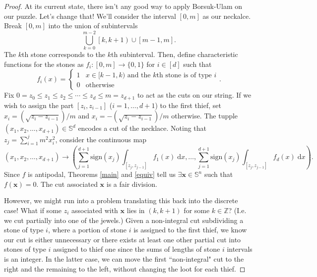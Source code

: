 \documentclass[12pt]{amsart}
\theoremstyle{definition}
\begin{document}
    \begin{proof}
        At its current state, there isn't any good way to apply Borsuk-Ulam on our puzzle. Let's change that! We'll consider the interval $[0,m]$ as our neckalce. Break $[0,m]$ into the union of subintervals $$\bigcup_{k=0}^{m-2} \left[k, k+1\right) \cup \left[m-1, m\right].$$ The $k$th stone corresponds to the $k$th subinterval. Then, define characteristic functions for the stones as $f_i:[0,m] \to \{0,1\}$ for $i \in [d]$ such that $$f_i(x) = \begin{cases} 1 & x \in [k-1, k) \text{ and the $k$th stone is of type $i$}\\ 0 & \text{otherwise} \end{cases}.$$ Fix $0 = z_0 \leq z_1 \leq z_2 \leq \cdots \leq z_d \leq m= z_{d+1}$ to act as the cuts on our string. If we wish to assign the part $[z_i,z_{i-1}]$ ($i = 1, \ldots, d+1$) to the first thief, set $x_i = \left(\sqrt{z_{i} - z_{i-1}}\right)/m$ and $x_i = -\left(\sqrt{z_i - z_{i-1}}\right)/m$ otherwise. The tupple $(x_1,x_2,\ldots,x_{d+1}) \in \mathbb S^d$ encodes a cut of the necklace. Noting that $z_j = \sum_{i=1}^{j} m^2x_i^2$, consider the continuous map $$(x_1,x_2,\ldots,x_{d+1}) \to \left(\sum_{j=1}^{d+1} \mathrm{sign}(x_j) \int_{[z_j,z_{j-1}]} f_1(x) \; \mathrm{d}x , \ldots, \sum_{j=1}^{d+1} \mathrm{sign}(x_j) \int_{[z_j,z_{j-1}]} f_d(x) \; \mathrm{d}x\right).$$ Since $f$ is antipodal, Theorems \ref{main} and \ref{equiv} tell us $\exists \mathbf x \in \mathbb S^n$ such that $f(\mathbf x) = 0$. The cut associated $\mathbf x$ is a fair division. 

        However, we might run into a problem translating this back into the discrete case! What if some $z_i$ associated with $\mathbf x$ lies in $\left(k, k+1\right)$ for some $k \in \mathbb Z$? (I.e. we cut partially into one of the jewels.) Given a non-integral cut subdividing a stone of type $i$, where a portion of stone $i$ is assigned to the first thief, we know our cut is either unnecessary or there exists at least one other partial cut into stones of type $i$ assigned to thief one since the sums of lengths of stone $i$ intervals is an integer. In the latter case, we can move the first ``non-integral" cut to the right and the remaining to the left, without changing the loot for each thief.
    \end{proof}

    
    
    
    
    
\end{document}
